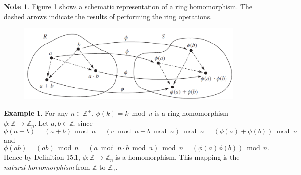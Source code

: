 \documentclass{article}
\theoremstyle{definition}
\newtheorem{example}{Example}[section]
\newtheorem{note}{Note}[section]
\begin{document}
\begin{note}
    Figure \ref{ring-homomorphism} shows a schematic representation of a ring homomorphism. The dashed arrows indicate the results of performing the ring operations.
\end{note}

\begin{figure}[!htbp]
    \centering
    \includegraphics[width=\linewidth]{figures/ring-homomorphism.png}
    \caption{}
    \label{ring-homomorphism}
\end{figure}

\begin{example}
    For any $n\in\mathbb{Z}^+$, $\phi(k)=k\bmod n$ is a ring homomorphism $\phi:\mathbb{Z}\to\mathbb{Z}_n$. Let $a,b\in\mathbb{Z}$, since
    \begin{equation*}
        \phi(a+b)=(a+b)\bmod n=(a\bmod n + b\bmod n)\bmod n=(\phi(a)+\phi(b))\bmod n
    \end{equation*}
    and
    \begin{equation*}
        \phi(ab)=(ab)\bmod n=(a\bmod n \cdot b \bmod n)\bmod n = (\phi(a)\phi(b))\bmod n.
    \end{equation*}
    Hence by Definition 15.1, $\phi:\mathbb{Z}\to\mathbb{Z}_n$ is a homomorphism. This mapping is the \textit{natural homomorphism} from $\mathbb{Z}$ to $\mathbb{Z}_n$.
\end{example}
\end{document}
